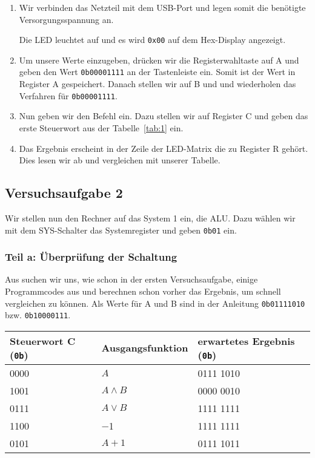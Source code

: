 \begin{enumerate}
	\item
		Wir verbinden das Netzteil mit dem USB-Port und legen somit die
		benötigte Versorgungsspannung an.

		Die LED leuchtet auf und es wird \texttt{0x00} auf dem Hex-Display
		angezeigt.

	\item
		Um unsere Werte einzugeben, drücken wir die Registerwahltaste auf A und
		geben den Wert \texttt{0b00001111} an der Tastenleiste ein. Somit ist
		der Wert in Register A gespeichert. Danach stellen wir auf B und und
		wiederholen das Verfahren für \texttt{0b00001111}.

	\item
		Nun geben wir den Befehl ein. Dazu stellen wir auf Register C und geben
		das erste Steuerwort aus der Tabelle~\ref{tab:1} ein.

	\item
		Das Ergebnis erscheint in der Zeile der LED-Matrix die zu Register R
		gehört. Dies lesen wir ab und vergleichen mit unserer Tabelle.
\end{enumerate}

\subsection{Versuchsaufgabe 2}

Wir stellen nun den Rechner auf das System 1 ein, die ALU. Dazu wählen wir mit
dem SYS-Schalter das Systemregister und geben \texttt{0b01} ein.

\subsubsection{Teil a: Überprüfung der Schaltung}

Aus \cite[Tabelle~8.2]{physik313-Anleitung} suchen wir uns, wie schon in der
ersten Versuchsaufgabe, einige Programmcodes aus und berechnen schon vorher das
Ergebnis, um schnell vergleichen zu können. Als Werte für A und B sind in der
Anleitung \texttt{0b01111010} bzw. \texttt{0b10000111}.

\begin{tabular}{lll}
	Steuerwort C (\texttt{0b}) & Ausgangsfunktion & erwartetes Ergebnis
	(\texttt{0b}) \\
	\hline
	0000 & $A$ & 0111 1010 \\
	1001 & $A \wedge B$ & 0000 0010 \\
	0111 & $A \vee B$ & 1111 1111 \\
	1100 & \num{-1} & 1111 1111 \\
	0101 & $A + 1$ & 0111 1011
\end{tabular}

